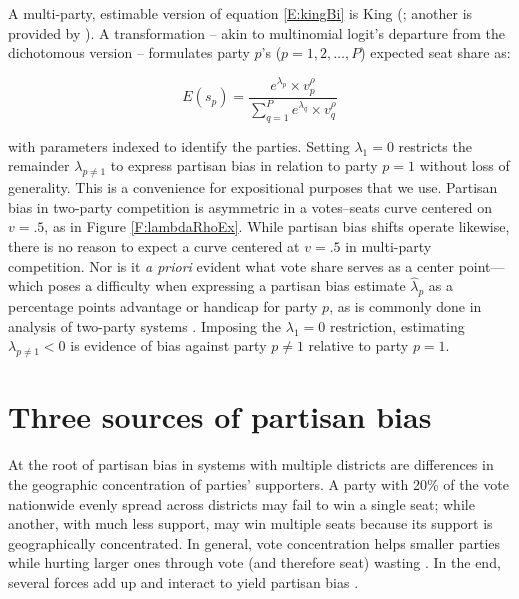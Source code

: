 \documentclass[letter,12pt]{article}
\begin{document}

A multi-party, estimable version of equation \ref{E:kingBi} is King (\citeyear{king.1990elRespBiasMultiparty}; another is provided by \citeauthor{calvo.micozzi.govReform.2005} \citeyear{calvo.micozzi.govReform.2005}). A transformation -- akin to multinomial logit's departure from the dichotomous version -- formulates party $p$'s ($p=1,2,\ldots,P$) expected seat share as:

\begin{equation}\label{E:kingMulti}
 E(s_p) = \frac{e^{\lambda_p} \times v_p^\rho}{\sum_{q=1}^{P} e^{\lambda_q} \times v_q^\rho}
\end{equation}

\noindent with parameters indexed to identify the parties. Setting $\lambda_1 = 0$ restricts the remainder $\lambda_{p \neq 1}$ to express partisan bias in relation to party $p=1$ without loss of generality. This is a convenience for expositional purposes that we use. Partisan bias in two-party competition is asymmetric in a votes--seats curve centered on $v=.5$, as in Figure \ref{F:lambdaRhoEx}. While partisan bias shifts operate likewise, there is no reason to expect a curve centered at $v=.5$ in multi-party competition. Nor is it \emph{a priori} evident what vote share serves as a center point---which poses a difficulty when expressing a partisan bias estimate $\hat{\lambda}_p$ as a percentage points advantage or handicap for party $p$, as is commonly done in analysis of two-party systems \citep[e.g.,][]{cox.katz.2002}. Imposing the $\lambda_1 = 0$ restriction, estimating $\lambda_{p \neq 1}<0$ is evidence of bias against party $p \neq 1$ relative to party $p=1$.

\section{Three sources of partisan bias}

At the root of partisan bias in systems with multiple districts are differences in the geographic concentration of parties' supporters. A party with 20\% of the vote nationwide evenly spread across districts may fail to win a single seat; while another, with much less support, may win multiple seats because its support is geographically concentrated. In general, vote concentration helps smaller parties while hurting larger ones through vote (and therefore seat) wasting \citep{calvo.roddenMultipartyPlurality2015}. In the end, several forces add up and interact to yield partisan bias \citep{gudgin.taylor.1980decomposeBias}. 
\end{document}
